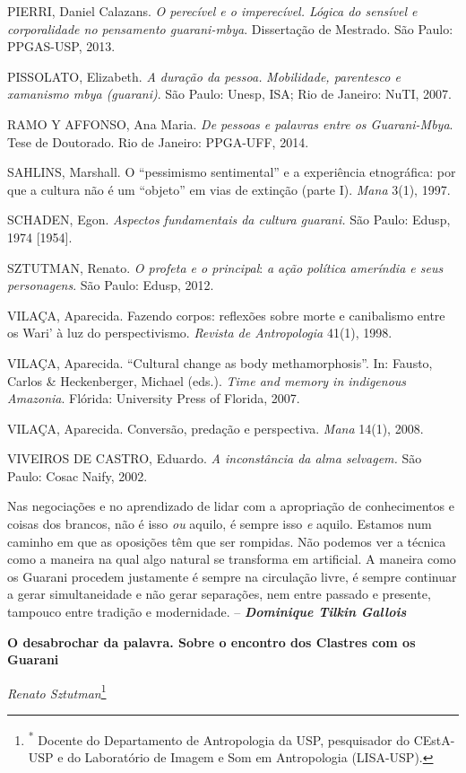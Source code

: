 PIERRI, Daniel Calazans. \emph{O perecível e o imperecível. Lógica do
sensível e corporalidade no pensamento guarani-mbya}. Dissertação de
Mestrado. São Paulo: PPGAS-USP, 2013.

PISSOLATO, Elizabeth. \emph{A duração da pessoa.} \emph{Mobilidade,
parentesco e xamanismo mbya (guarani)}. São Paulo: Unesp, ISA; Rio de
Janeiro: NuTI, 2007.

RAMO Y AFFONSO, Ana Maria. \emph{De pessoas e palavras entre os
Guarani-Mbya}. Tese de Doutorado. Rio de Janeiro: PPGA-UFF, 2014.

SAHLINS, Marshall. O ``pessimismo sentimental'' e a experiência
etnográfica: por que a cultura não é um ``objeto'' em vias de extinção
(parte I). \emph{Mana} 3(1), 1997.

SCHADEN, Egon. \emph{Aspectos fundamentais da cultura guarani.} São
Paulo: Edusp, 1974 {[}1954{]}.

SZTUTMAN, Renato. \emph{O profeta e o principal}: \emph{a ação política
ameríndia e seus personagens}. São Paulo: Edusp, 2012.

VILAÇA, Aparecida. Fazendo corpos: reflexões sobre morte e canibalismo
entre os Wari' à luz do perspectivismo. \emph{Revista de Antropologia}
41(1), 1998.

VILAÇA, Aparecida. ``Cultural change as body methamorphosis''. In:
Fausto, Carlos \& Heckenberger, Michael (eds.). \emph{Time and memory in
indigenous Amazonia}. Flórida: University Press of Florida, 2007.

VILAÇA, Aparecida. Conversão, predação e perspectiva. \emph{Mana} 14(1),
2008.

VIVEIROS DE CASTRO, Eduardo. \emph{A inconstância da alma selvagem.} São
Paulo: Cosac Naify, 2002.

Nas negociações e no aprendizado de lidar com a apropriação de
conhecimentos e coisas dos brancos, não é isso \emph{ou} aquilo, é
sempre isso \emph{e} aquilo. Estamos num caminho em que as oposições têm
que ser rompidas. Não podemos ver a técnica como a maneira na qual algo
natural se transforma em artificial. A maneira como os Guarani procedem
justamente é sempre na circulação livre, é sempre continuar a gerar
simultaneidade e não gerar separações, nem entre passado e presente,
tampouco entre tradição e modernidade. -- \emph{\textbf{Dominique Tilkin
Gallois}}

\textbf{O desabrochar da palavra. Sobre o encontro dos Clastres com os
Guarani}

\emph{Renato Sztutman}\footnote{\textsuperscript{*} Docente do
  Departamento de Antropologia da USP, pesquisador do CEstA-USP e do
  Laboratório de Imagem e Som em Antropologia (LISA-USP).}

